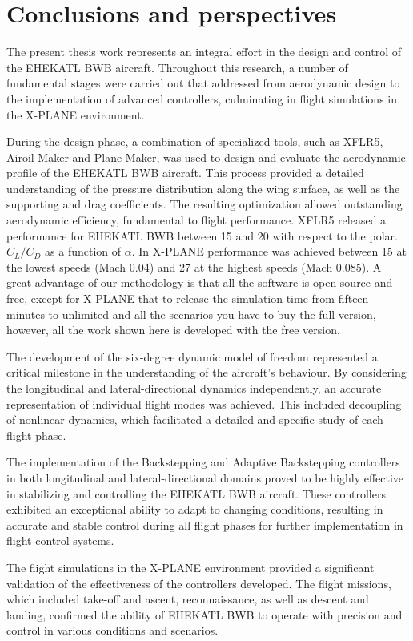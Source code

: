 \chapter{Conclusions and perspectives}

The present thesis work represents an integral effort in the design and control of the EHEKATL BWB aircraft. Throughout this research, a number of fundamental stages were carried out that addressed from aerodynamic design to the implementation of advanced controllers, culminating in flight simulations in the X-PLANE environment. 

During the design phase, a combination of specialized tools, such as XFLR5, Airoil Maker and Plane Maker, was used to design and evaluate the aerodynamic profile of the EHEKATL BWB aircraft. This process provided a detailed understanding of the pressure distribution along the wing surface, as well as the supporting and drag coefficients. The resulting optimization allowed outstanding aerodynamic efficiency, fundamental to flight performance. XFLR5 released a performance for EHEKATL BWB between 15 and 20 with respect to the polar. $C_L/C_D$ as a function of $\alpha$. In X-PLANE performance was achieved between 15 at the lowest speeds (Mach 0.04) and 27 at the highest speeds (Mach 0.085). A great advantage of our methodology is that all the software is open source and free, except for X-PLANE that to release the simulation time from fifteen minutes to unlimited and all the scenarios you have to buy the full version, however, all the work shown here is developed with the free version. 

The development of the six-degree dynamic model of freedom represented a critical milestone in the understanding of the aircraft's behaviour. By considering the longitudinal and lateral-directional dynamics independently, an accurate representation of individual flight modes was achieved. This included decoupling of nonlinear dynamics, which facilitated a detailed and specific study of each flight phase.

The implementation of the Backstepping and Adaptive Backstepping controllers in both longitudinal and lateral-directional domains proved to be highly effective in stabilizing and controlling the EHEKATL BWB aircraft. These controllers exhibited an exceptional ability to adapt to changing conditions, resulting in accurate and stable control during all flight phases for further implementation in flight control systems.

The flight simulations in the X-PLANE environment provided a significant validation of the effectiveness of the controllers developed. The flight missions, which included take-off and ascent, reconnaissance, as well as descent and landing, confirmed the ability of EHEKATL BWB to operate with precision and control in various conditions and scenarios.



